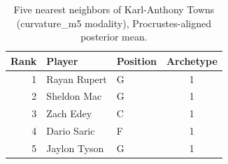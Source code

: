 \begin{table}[htbp]
  \centering\small
  \begin{tabular}{rllc}
    \toprule
    Rank & Player & Position & Archetype \\
    \midrule
    1 & Rayan Rupert & G & 1 \\
    2 & Sheldon Mac & G & 1 \\
    3 & Zach Edey & C & 1 \\
    4 & Dario Saric & F & 1 \\
    5 & Jaylon Tyson & G & 1 \\
    \bottomrule
  \end{tabular}
  \caption{Five nearest neighbors of Karl-Anthony Towns (curvature_m5 modality), Procrustes-aligned posterior mean.}
  \label{tab:Karl_Anthony_Towns_neighbors_curvature_m5}
\end{table}

